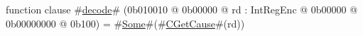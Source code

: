 function clause #\hyperref[sailMIPSzdecode]{decode}# (0b010010 @ 0b00000 @ rd : IntRegEnc @    0b00000 @ 0b00000000 @ 0b100) = #\hyperref[sailMIPSzSome]{Some}#(#\hyperref[sailMIPSzCGetCause]{CGetCause}#(rd))
